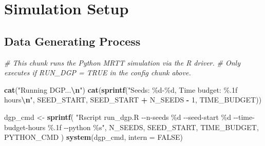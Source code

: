 \documentclass[
]{article}
\newenvironment{Shaded}{\begin{snugshade}}{\end{snugshade}}
\newcommand{\AttributeTok}[1]{\textcolor[rgb]{0.13,0.29,0.53}{#1}}
\newcommand{\CommentTok}[1]{\textcolor[rgb]{0.56,0.35,0.01}{\textit{#1}}}
\newcommand{\ConstantTok}[1]{\textcolor[rgb]{0.56,0.35,0.01}{#1}}
\newcommand{\DecValTok}[1]{\textcolor[rgb]{0.00,0.00,0.81}{#1}}
\newcommand{\FunctionTok}[1]{\textcolor[rgb]{0.13,0.29,0.53}{\textbf{#1}}}
\newcommand{\NormalTok}[1]{#1}
\newcommand{\OtherTok}[1]{\textcolor[rgb]{0.56,0.35,0.01}{#1}}
\newcommand{\SpecialCharTok}[1]{\textcolor[rgb]{0.81,0.36,0.00}{\textbf{#1}}}
\newcommand{\StringTok}[1]{\textcolor[rgb]{0.31,0.60,0.02}{#1}}
\begin{document}
\section{Simulation Setup}\label{simulation-setup}

\subsection{Data Generating Process}\label{data-generating-process}

\begin{Shaded}
\begin{Highlighting}[]
\CommentTok{\# This chunk runs the Python MRTT simulation via the R driver.}
\CommentTok{\# Only executes if RUN\_DGP = TRUE in the config chunk above.}

\FunctionTok{cat}\NormalTok{(}\StringTok{"Running DGP...}\SpecialCharTok{\textbackslash{}n}\StringTok{"}\NormalTok{)}
\FunctionTok{cat}\NormalTok{(}\FunctionTok{sprintf}\NormalTok{(}\StringTok{"Seeds: \%d{-}\%d, Time budget: \%.1f hours}\SpecialCharTok{\textbackslash{}n}\StringTok{"}\NormalTok{,}
\NormalTok{            SEED\_START, SEED\_START }\SpecialCharTok{+}\NormalTok{ N\_SEEDS }\SpecialCharTok{{-}} \DecValTok{1}\NormalTok{, TIME\_BUDGET))}

\NormalTok{dgp\_cmd }\OtherTok{\textless{}{-}} \FunctionTok{sprintf}\NormalTok{(}
  \StringTok{"Rscript run\_dgp.R {-}{-}n{-}seeds \%d {-}{-}seed{-}start \%d {-}{-}time{-}budget{-}hours \%.1f {-}{-}python \%s"}\NormalTok{,}
\NormalTok{  N\_SEEDS, SEED\_START, TIME\_BUDGET, PYTHON\_CMD}
\NormalTok{)}
\FunctionTok{system}\NormalTok{(dgp\_cmd, }\AttributeTok{intern =} \ConstantTok{FALSE}\NormalTok{)}
\end{Highlighting}
\end{Shaded}
\end{document}
